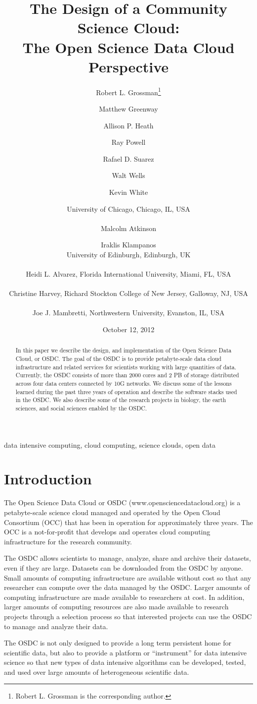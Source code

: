 \documentclass[11pt,twocolumn]{article}
\title{The Design of a Community Science Cloud: \protect\\
The Open Science Data Cloud Perspective}
\author{Robert L. Grossman\footnote{Robert L. Grossman is the corresponding author.} 
\and Matthew Greenway \and Allison P. Heath 
\and Ray Powell \and Rafael D. Suarez \and Walt Wells \and Kevin White \and
University of Chicago, Chicago, IL, USA
\protect\\
\protect\\
Malcolm Atkinson \and Iraklis Klampanos \protect\\
University of Edinburgh, Edinburgh, UK
\protect\\
\protect\\
Heidi L. Alvarez, Florida International University, Miami, FL, USA
\protect\\
\protect\\
Christine Harvey, Richard Stockton College of New Jersey, Galloway, NJ, USA
\protect\\
\protect\\
Joe J. Mambretti, Northwestern University, Evanston, IL, USA
}
\date{October 12, 2012}
\newcommand{\ph}[1]{\medbreak \noindent {\bf #1}}
\begin{document}
\maketitle


\begin{abstract}
In this paper we describe the design, and implementation of
the Open Science Data Cloud, or OSDC. The goal of the OSDC is to
provide petabyte-scale data cloud infrastructure and related
services for scientists working with large quantities of
data. Currently, the OSDC consists of more than 2000 cores and 2 PB
of storage distributed across four data centers connected by 10G
networks. We discuss some of the lessons learned during the past three years of operation
and describe the software stacks used in the OSDC.  We also
describe some of the research projects in
biology, the earth sciences, and social sciences enabled by the OSDC.
\end{abstract}

\ph{Keywords:}
data intensive computing, cloud computing, science clouds, open data


\section{Introduction}
The Open Science Data Cloud or OSDC (www.opensciencedatacloud.org) is
a petabyte-scale science cloud managed and operated by the Open Cloud
Consortium (OCC) that has been in operation for approximately three years.
The OCC is a not-for-profit that develops and operates cloud computing
infrastructure for the research community.  

The OSDC allows scientists to manage, analyze, share and archive their
datasets, even if they are large.  Datasets can be downloaded from the
OSDC by anyone.  Small amounts of computing infrastructure are
available without cost so that any researcher can compute over the
data managed by the OSDC.  Larger amounts of computing infrastructure
are made available to researchers at cost.  In addition, larger
amounts of computing resources are also made available to research
projects through a selection process so that interested projects can
use the OSDC to manage and analyze their data.

The OSDC is not only designed to provide a long term persistent home
for scientific data, but also to provide a platform or ``instrument''
for data intensive science so that new types of data intensive
algorithms can be developed, tested, and used over large amounts of
heterogeneous scientific data.
\end{document}
